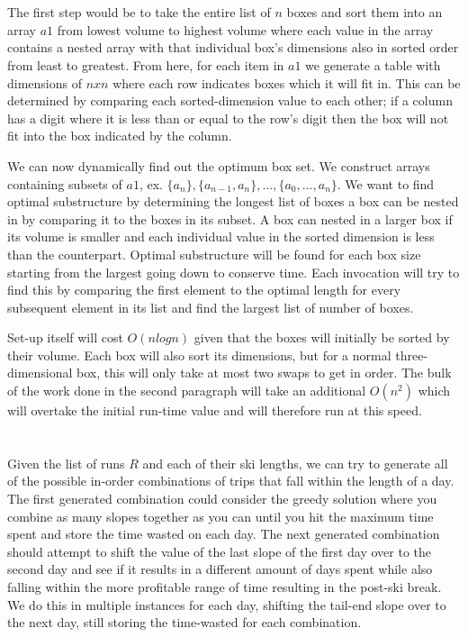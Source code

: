 \documentclass[12pt]{article}
\begin{document}
\section{}
The first step would be to take the entire list of \(n\) boxes and sort them into an array \(a1\) from lowest volume to highest volume where each value in the array contains a nested array with that individual box's dimensions also in sorted order from least to greatest. From here, for each item in \(a1\) we generate a table with dimensions of \(n x n\) where each row indicates boxes which it will fit in. This can be determined by comparing each sorted-dimension value to each other; if a column has a digit where it is less than or equal to the row's digit then the box will not fit into the box indicated by the column.\newline

\noindent We can now dynamically find out the optimum box set. We construct arrays containing subsets of \(a1\), ex. \(\{a_n\}, \{a_{n-1}, a_n\}, ..., \{a_0, ..., a_n\}\). We want to find optimal substructure by determining the longest list of boxes a box can be nested in by comparing it to the boxes in its subset. A box can nested in a larger box if its volume is smaller and each individual value in the sorted dimension is less than the counterpart. Optimal substructure will be found for each box size starting from the largest going down to conserve time. Each invocation will try to find this by comparing the first element to the optimal length for every subsequent element in its list and find the largest list of number of boxes.\newline

\noindent Set-up itself will cost \(O(nlogn)\) given that the boxes will initially be sorted by their volume. Each box will also sort its dimensions, but for a normal three-dimensional box, this will only take at most two swaps to get in order. The bulk of the work done in the second paragraph will take an additional \(O(n^2)\) which will overtake the initial run-time value and will therefore run at this speed.

\section{}
Given the list of runs \(R\) and each of their ski lengths, we can try to generate all of the possible in-order combinations of trips that fall within the length of a day. The first generated combination could consider the greedy solution where you combine as many slopes together as you can until you hit the maximum time spent and store the time wasted on each day. The next generated combination should attempt to shift the value of the last slope of the first day over to the second day and see if it results in a different amount of days spent while also falling within the more profitable range of time resulting in the post-ski break. We do this in multiple instances for each day, shifting the tail-end slope over to the next day, still storing the time-wasted for each combination.\newline
\end{document}
